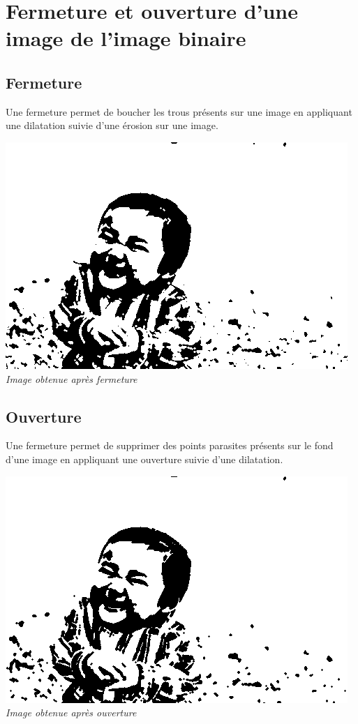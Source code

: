 \documentclass[a4paper,11pt]{article}
\begin{document}
\newpage
\section{Fermeture et ouverture d'une image de l'image binaire}
\subsection{Fermeture}
Une fermeture permet de boucher les trous présents sur une image en appliquant une dilatation suivie d'une érosion sur une image.
\begin{center}
\includegraphics[scale=0.7]{babyferme.png}\\
\textit{Image obtenue après fermeture}
\end{center}
\subsection{Ouverture}
Une fermeture permet de supprimer des points parasites présents sur le fond d'une image en appliquant une ouverture suivie d'une dilatation.
\begin{center}
\includegraphics[scale=0.7]{babyouvert.png}\\
\textit{Image obtenue après ouverture}
\end{center}
\end{document}
